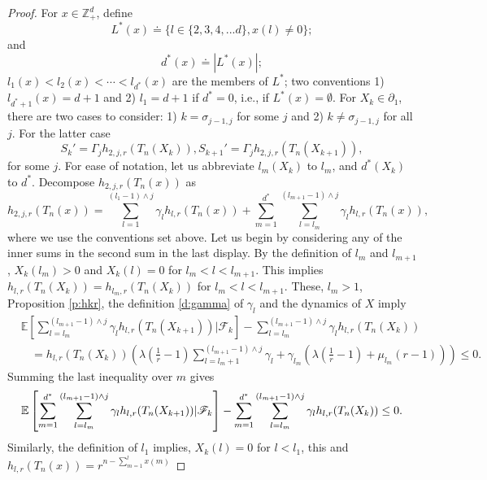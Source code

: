 \documentclass[10pt,a4paper]{amsart}
\begin{document}
\begin{proof}
For $x \in {\mathbb Z}_+^d$, define
\[
L^*(x) \doteq \{ l \in \{2,3,4,...d\}, x(l) \neq 0 \};
\]
and 
\[
d^*(x) \doteq |L^*(x)|;
\]
$l_1(x) < l_2(x) < \cdots < l_{d^*}(x)$ are the members of $L^*$; two
conventions 1)
$l_{d^*+1}(x) = d+1$ and 2) $l_1 = d+1$
 if $d^* = 0$, i.e., if $L^*(x) = \emptyset.$
For $X_k \in \partial_1$, 
there are two cases to consider: 1) $k = \sigma_{j-1,j}$
for some $j$ and 2)  $k \neq \sigma_{j-1,j}$ for all $j$.
For the latter case 
\begin{equation}\label{e:skpp1}
S_k' = \Gamma_j h_{2,j,r}(T_n(X_k)),
S_{k+1}' = \Gamma_j h_{2,j,r}(T_n(X_{k+1})),
\end{equation}
for some $j$.
For ease of notation, let us abbreviate $l_m(X_{k})$ to $l_m$, 
and $d^*(X_{k})$ to $d^*$.
Decompose
$h_{2,j,r}(T_n(x))$ as
\begin{equation}\label{e:decomposeh2jr}
h_{2,j,r}(T_n(x)) = 
\sum_{l=1}^{(l_1-1) \wedge j}\gamma_l h_{l,r}(T_n(x)) 
+ \sum_{m=1}^{d^*} \sum_{l=l_m}^{(l_{m+1} -1)\wedge j} \gamma_l h_{l,r}(T_n(x)),
\end{equation}
where we use the conventions set above.
Let us begin by considering any of the inner sums in the
second sum in the last display. By the definition
of $l_m$ and $l_{m+1}$, $X_k(l_m) > 0$ and
$X_k(l) = 0$ for $l_m < l < l_{m+1}$. This implies
$h_{l,r}(T_n(X_k))  = h_{l_m,r}(T_n(X_k))$ 
for $l_m < l < l_{m+1}$. These, $l_m > 1$, Proposition \ref{p:hkr},
the definition \eqref{d:gamma} of $\gamma_l$ and the dynamics of $X$ imply
\begin{align*}
&{\mathbb E}
\left
[\sum_{l=l_m}^{(l_{m+1} -1)\wedge j} \gamma_l h_{l,r}(T_n(X_{k+1}))
| {\mathscr F}_k \right] -
\sum_{l=l_m}^{(l_{m+1} -1)\wedge j} \gamma_l h_{l,r}(T_n(X_k))\\
&~~~~=
h_{l,r}(T_n(X_k))
\left(
\lambda \left( \frac{1}{r} - 1 \right)
\sum_{l=l_m+1}^{(l_{m+1} -1)\wedge j} \gamma_l 
+ \gamma_{l_m} \left( \lambda\left(\frac{1}{r} -1\right) 
+ \mu_{l_m}(r-1) \right)\right)
\le 0.
\end{align*}
Summing the last inequality over $m$ gives
\begin{equation}\label{e:therestSkp}
{\mathbb E}
\left
[\sum_{m=1}^{d^*}\sum_{l=l_m}^{(l_{m+1} -1)\wedge j} \gamma_l h_{l,r}(T_n(X_{k+1}))
| {\mathscr F}_k \right] -
\sum_{m=1}^{d^*}\sum_{l=l_m}^{(l_{m+1} -1)\wedge j} \gamma_l h_{l,r}(T_n(X_k))\\
\le 0.
\end{equation}
Similarly, the definition of $l_1$ implies, $X_k(l) = 0$ for $l< l_1$,
this and $h_{l,r}(T_n(x)) = r^{n-\sum_{m=1}^l x(m)}$

\end{proof}
\end{document}
